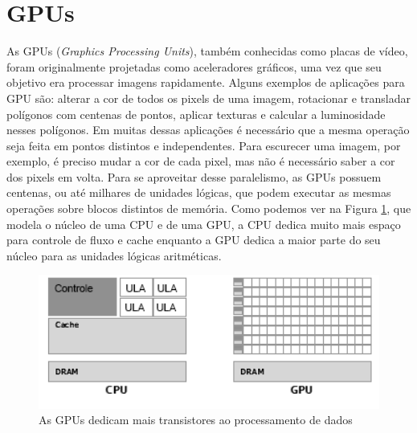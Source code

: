\section{GPUs}\label{sec:GPU}
As GPUs (\emph{Graphics Processing Units}), também conhecidas como placas de vídeo, foram originalmente projetadas  como aceleradores gráficos, uma vez que seu objetivo era processar imagens rapidamente. Alguns exemplos de aplicações para GPU são: alterar a cor de todos os pixels de uma imagem, rotacionar e transladar polígonos com centenas de pontos, aplicar texturas e calcular a luminosidade nesses polígonos. 
Em muitas dessas aplicações é necessário que a mesma operação seja feita em pontos distintos e independentes. Para escurecer uma imagem, por exemplo, é preciso mudar a cor de cada pixel, mas não é necessário saber a cor dos pixels em volta. 
Para se aproveitar desse paralelismo, as GPUs possuem centenas, ou até milhares de unidades lógicas, que podem executar as mesmas operações sobre blocos distintos de memória. Como podemos ver na Figura \ref{fig:gpu_1}, que modela o núcleo de uma CPU e de uma GPU, a CPU dedica muito mais espaço para controle de fluxo e cache enquanto a GPU dedica a maior parte do seu núcleo para as unidades lógicas aritméticas.

\begin{figure}
  \centering
  \includegraphics[width=1\textwidth]{imagens/gpu_1.png}
  \caption{As GPUs dedicam mais transistores ao processamento de dados \cite{CUDA}}
  \label{fig:gpu_1}
\end{figure}

